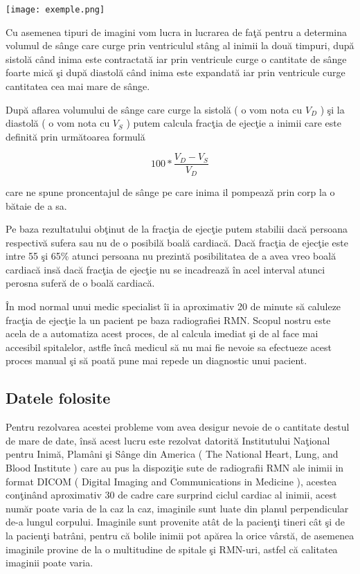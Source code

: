 \texttt{[image: exemple.png]}

Cu asemenea tipuri de imagini vom lucra in lucrarea de fa\c{t}\u{a} pentru a determina volumul de s\^{a}nge care curge prin ventriculul st\^{a}ng al inimii la dou\u{a} timpuri, dup\u{a} sistol\u{a} c\^{a}nd inima este contractat\u{a} iar prin ventricule curge o cantitate de s\^{a}nge foarte mic\u{a} \c{s}i dup\u{a} diastol\u{a} c\^{a}nd inima este expandat\u{a} iar prin ventricule curge cantitatea cea mai mare de s\^{a}nge.
\par
Dup\u{a} aflarea volumului de s\^{a}nge care curge la sistol\u{a} ( o vom nota cu \textbf{\textit{$V_D$}} ) \c{s}i la diastol\u{a} ( o vom nota cu \textbf{\textit{$V_S$}} ) putem calcula frac\c{t}ia de ejec\c{t}ie a inimii care este definit\u{a} prin urm\u{a}toarea formul\u{a}

$$100 * \frac{V_D - V_S}{V_D}$$

care ne spune proncentajul de s\^{a}nge pe care inima il pompeaz\u{a} prin corp la o b\u{a}taie de a sa.
\par
Pe baza rezultatului ob\c{t}inut de la frac\c{t}ia de ejec\c{t}ie putem stabilii dac\u{a} persoana respectiv\u{a} sufera sau nu de o posibil\u{a} boal\u{a} cardiac\u{a}. Dac\u{a} frac\c{t}ia de ejec\c{t}ie este intre 55 \c{s}i 65\% atunci persoana nu prezint\u{a} posibilitatea de a avea vreo boal\u{a} cardiac\u{a} ins\u{a} dac\u{a} frac\c{t}ia de ejec\c{t}ie nu se incadreaz\u{a} \^{i}n acel interval atunci perosna sufer\u{a} de o boal\u{a} cardiac\u{a}.
\par
\^{I}n mod normal unui medic specialist \^{i}i ia aproximativ 20 de minute s\u{a} caluleze frac\c{t}ia de ejec\c{t}ie la un pacient pe baza radiografiei RMN. Scopul nostru este acela de a automatiza acest proces, de al calcula imediat \c{s}i de al face mai accesibil spitalelor, astfle \^{i}nc\^{a} medicul s\u{a} nu mai fie nevoie sa efectueze acest proces manual \c{s}i s\u{a} poat\u{a} pune mai repede un diagnostic unui pacient.

\subsection{Datele folosite}

Pentru rezolvarea acestei probleme vom avea desigur nevoie de o cantitate destul de mare de date, \^{i}ns\u{a} acest lucru este rezolvat datorit\u{a} Institutului Na\c{t}ional pentru Inim\u{a}, Plam\^{a}ni \c{s}i S\^{a}nge din America ( The National Heart, Lung, and Blood Institute ) care au pus la dispozi\c{t}ie sute de radiografii RMN ale inimii in format DICOM ( Digital Imaging and Communications in Medicine ), acestea con\c{t}in\^{a}nd aproximativ 30 de cadre care surprind ciclul cardiac al inimii, acest num\u{a}r poate varia de la caz la caz, imaginile sunt luate din planul perpendicular de-a lungul corpului. Imaginile sunt provenite at\^{a}t de la pacien\c{t}i tineri c\^{a}t \c{s}i de la pacien\c{t}i batr\^{a}ni, pentru c\u{a} bolile inimii pot ap\u{a}rea la orice v\^{a}rst\u{a}, de asemenea imaginile provine de la o multitudine de spitale \c{s}i RMN-uri, astfel c\u{a} calitatea imaginii poate varia.

